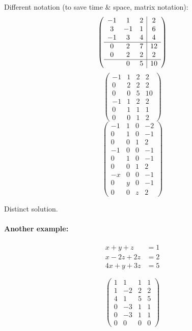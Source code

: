 \documentclass[a4paper,landscape,twocolumn]{article}
\begin{document}
Different notation (to save time \& space, matrix notation):
\[
  \left(\begin{array}{ccc|c}
    -1 &  1 &  2 &  2 \\
     3 & -1 &  1 &  6 \\
    -1 &  3 &  4 &  4 \\
   \hline
     0 &  2 &  7 & 12 \\
     0 &  2 &  2 &  2 \\
   \hline
       &  0 &  5 & 10
  \end{array}\right)
\] \[
  \left(\begin{array}{ccc|c}
    -1 &  1 &  2 & 2 \\
     0 &  2 &  2 & 2 \\
     0 &  0 &  5 & 10 \\
   \hline
    -1 &  1 &  2 & 2 \\
     0 &  1 &  1 & 1 \\
     0 &  0 &  1 & 2
  \end{array}\right)
\] \[
  \left(\begin{array}{ccc|c}
    -1 &  1 &  0 & -2 \\
     0 &  1 &  0 & -1 \\
     0 &  0 &  1 & 2 \\
   \hline
    -1 &  0 &  0 & -1 \\
     0 &  1 &  0 & -1 \\
     0 &  0 &  1 & 2 \\
   \hline
    -x &  0 &  0 & -1 \\
     0 &  y &  0 & -1 \\
     0 &  0 &  z & 2
  \end{array}\right)
\]

Distinct solution.

\paragraph{Another example:}

\begin{align*}
  x + y + z &= 1 \\
  x - 2z + 2z &= 2 \\
  4x + y + 3z &= 5
\end{align*}

\[
  \left(\begin{array}{ccc|c}
     1 &  1 &  1 & 1 \\
     1 & -2 &  2 & 2 \\
     4 &  1 &  5 & 5 \\
   \hline
     0 & -3 &  1 & 1 \\
     0 & -3 &  1 & 1 \\
   \hline
     0 &  0 &  0 & 0
  \end{array}\right)
\]
\end{document}
